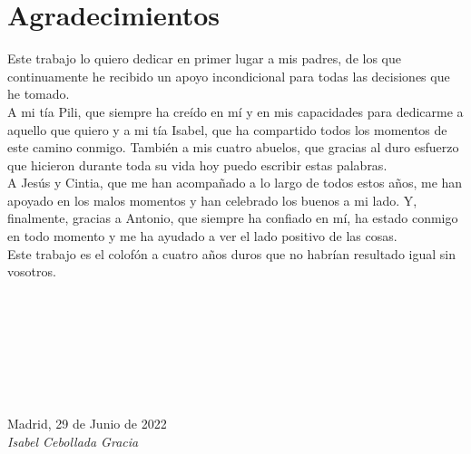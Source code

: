 \cleardoublepage

\chapter*{Agradecimientos}

Este trabajo lo quiero dedicar en primer lugar a mis padres, de los que continuamente he recibido un apoyo incondicional para todas las decisiones que he tomado.\\

A mi tía Pili, que siempre ha creído en mí y en mis capacidades para dedicarme a aquello que quiero y a mi tía Isabel, que ha compartido todos los momentos de este camino conmigo. También a mis cuatro abuelos, que gracias al duro esfuerzo que hicieron durante toda su vida hoy puedo escribir estas palabras.\\

A Jesús y Cintia, que me han acompañado a lo largo de todos estos años, me han apoyado en los malos momentos y han celebrado los buenos a mi lado. Y, finalmente, gracias a Antonio, que siempre ha confiado en mí, ha estado conmigo en todo momento y me ha ayudado a ver el lado positivo de las cosas.\\

Este trabajo es el colofón a cuatro años duros que no habrían resultado igual sin vosotros.

\ %

\

\

\

\begin{flushright}
		\vspace{1.0 cm}
		Madrid, 29 de Junio de 2022\\ %
		\emph{Isabel Cebollada Gracia}
\end{flushright}

\thispagestyle{empty}

